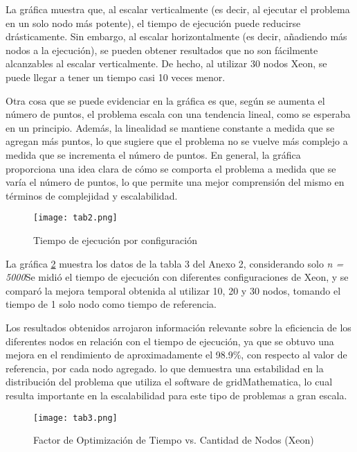 \begin{spacing}{1.5}
          La gráfica muestra que, al escalar verticalmente (es decir, al ejecutar el problema en un solo nodo más potente), el tiempo de ejecución puede reducirse drásticamente. Sin embargo, al escalar horizontalmente (es decir, añadiendo más nodos a la ejecución), se pueden obtener resultados que no son fácilmente alcanzables al escalar verticalmente. De hecho, al utilizar 30 nodos Xeon, se puede llegar a tener un tiempo casi 10 veces menor.
          
          Otra cosa que se puede evidenciar en la gráfica es que, según se aumenta el número de puntos, el problema escala con una tendencia lineal, como se esperaba en un principio. Además, la linealidad se mantiene constante a medida que se agregan más puntos, lo que sugiere que el problema no se vuelve más complejo a medida que se incrementa el número de puntos. En general, la gráfica proporciona una idea clara de cómo se comporta el problema a medida que se varía el número de puntos, lo que permite una mejor comprensión del mismo en términos de complejidad y escalabilidad. \newpage

      \begin{figure}[h]
            \centering
            \texttt{[image: tab2.png]}
            \caption{Tiempo de ejecución por configuración}
            \label{fig:etiquetab}
      \end{figure} 

      La gráfica \ref{fig:etiquetac} muestra los datos de la tabla 3 del Anexo 2,
      considerando solo \textit{n = 5000}Se midió el tiempo de ejecución con
      diferentes configuraciones de Xeon, y se comparó la mejora temporal
      obtenida al utilizar 10, 20 y 30 nodos, tomando el tiempo de 1 solo nodo
      como tiempo de referencia.
      
      Los resultados obtenidos arrojaron información relevante sobre la
      eficiencia de los diferentes nodos en relación con el tiempo de ejecución,
      ya que se obtuvo una mejora en el rendimiento de aproximadamente el 98.9\%,
      con respecto al valor de referencia, por cada nodo agregado. lo que
      demuestra una estabilidad en la distribución del problema que utiliza el
      software de gridMathematica, lo cual resulta importante en la
      escalabilidad para este tipo de problemas a gran escala.

      \begin{figure}[h]
            \centering
            \texttt{[image: tab3.png]}
            \caption{Factor de Optimización de Tiempo vs. Cantidad de Nodos (Xeon)}
            \label{fig:etiquetac}
      \end{figure}


\end{spacing}
